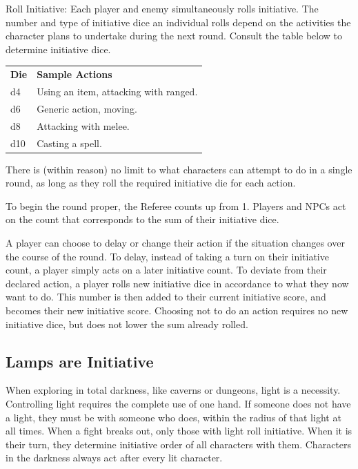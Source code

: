 \documentclass[twoside]{article}
\begin{document}
\bigbreak

Roll Initiative: Each player and enemy simultaneously rolls initiative. The number and type of initiative dice an individual rolls depend on the activities the character plans to undertake during the next round. Consult the table below to determine initiative dice. 

\bigbreak

\begin{center}
\noindent\begin{tabular}{>{\centering\arraybackslash}p{}p{}}
\textbf{Die}&\textbf{Sample Actions}\\
\rowcolor[gray]{0.75}d4&Using an item, attacking with ranged.\\
d6&Generic action, moving.\\
\rowcolor[gray]{0.75}d8&Attacking with melee.\\
d10&Casting a spell.\\
\end{tabular}
\end{center}

\bigbreak

There is (within reason) no limit to what characters can attempt to do in a single round, as long as they roll the required initiative die for each action.

\bigbreak

To begin the round proper, the Referee counts up from 1. Players and NPCs act on the count that corresponds to the sum of their initiative dice.

\bigbreak

A player can choose to delay or change their action if the situation changes over the course of the round. To delay, instead of taking a turn on their initiative count, a player simply acts on a later initiative count. To deviate from their declared action, a player rolls new initiative dice in accordance to what they now want to do. This number is then added to their current initiative score, and becomes their new initiative score. Choosing not to do an action requires no new initiative dice, but does not lower the sum already rolled.

\subsection*{Lamps are Initiative}

When exploring in total darkness, like caverns or dungeons, light is a necessity. Controlling light requires the complete use of one hand. If someone does not have a light, they must be with someone who does, within the radius of that light at all times. When a fight breaks out, only those with light roll initiative. When it is their turn, they determine initiative order of all characters with them. Characters in the darkness always act after every lit character.
\end{document}
